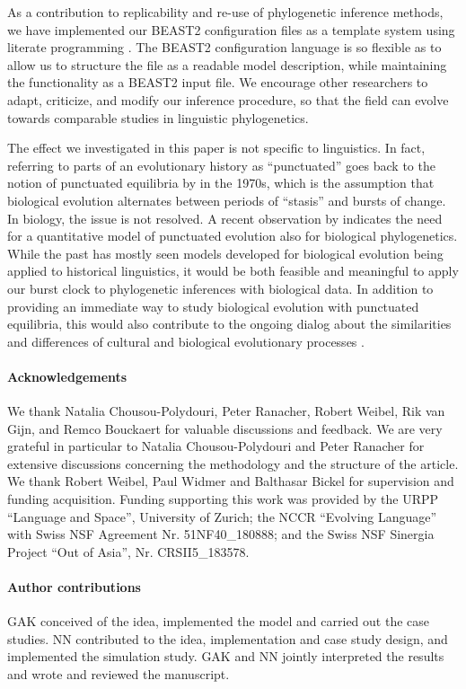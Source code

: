 \documentclass[]{rsos}%
\begin{document}
As a contribution to replicability and re-use of phylogenetic inference methods,
we have implemented our BEAST2 configuration
files as a template system using literate programming \parencite{knuth1984literate}. The BEAST2 configuration language is so
flexible as to allow us to structure the file as a readable model description,
while maintaining the functionality as a BEAST2 input file. We encourage other
researchers to adapt, criticize, and modify our inference procedure, so that 
the field can evolve towards comparable studies in
linguistic phylogenetics.

The effect we investigated in this paper
is not specific to linguistics. In fact, referring to parts
of an evolutionary history as “punctuated” goes back to the notion of
punctuated equilibria by \textcite{eldredge1972punctuated} in the 1970s, which
is the
assumption that biological evolution alternates between periods of “stasis” and
bursts of change.
In biology, the issue is not resolved. A recent observation by
\textcite{janzen2021nucleotide} indicates the need for a quantitative model of
punctuated evolution also for biological phylogenetics.
While
the past has mostly seen models developed for biological evolution being applied to
historical linguistics, 
it would be both feasible and meaningful to apply our burst clock to
phylogenetic inferences with biological data.
In addition to providing an immediate way to study biological evolution with punctuated equilibria, 
this would also contribute to the ongoing dialog about the similarities
and differences of cultural and biological evolutionary processes \parencite{list2016alignments,levinson2012tools}.

\paragraph{Acknowledgements}
We thank  Natalia Chousou-Polydouri, Peter Ranacher, Robert Weibel, Rik van Gijn, and Remco Bouckaert
for valuable discussions and feedback. We are very grateful in particular to Natalia Chousou-Polydouri and Peter Ranacher for extensive discussions concerning the methodology and the structure of the article.
We thank Robert Weibel, Paul Widmer and Balthasar Bickel for supervision and funding acquisition.
Funding supporting this work was provided by the
URPP “Language and Space”, University of Zurich; the NCCR “Evolving Language” with Swiss
NSF Agreement Nr. 51NF40\_180888; and the Swiss NSF Sinergia Project “Out of Asia”, Nr. CRSII5\_183578.

\paragraph{Author contributions}
GAK conceived of the idea, implemented the model and carried out the case studies. NN contributed to the idea, implementation and case study design, and implemented the simulation study. GAK and NN jointly interpreted the results and wrote and reviewed the manuscript.
\end{document}
